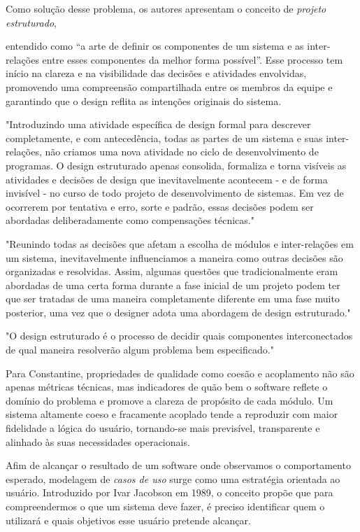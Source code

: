 \documentclass[12pt,a4paper]{article}
\begin{document}
Como solução desse problema, os autores apresentam o conceito de \textit{projeto estruturado}, %

entendido como “a arte de definir os componentes de um sistema e as inter-relações entre esses componentes da melhor forma possível”\textcite{yourdon1979structured}. Esse processo tem início na clareza e na visibilidade das decisões e atividades envolvidas, promovendo uma compreensão compartilhada entre os membros da equipe e garantindo que o design reflita as intenções originais do sistema.

"Introduzindo uma atividade específica de design formal para descrever completamente, e com antecedência, todas as partes de um sistema e suas inter-relações, não criamos uma nova atividade no ciclo de desenvolvimento de programas. O design estruturado apenas consolida, formaliza e torna visíveis as atividades e decisões de design que inevitavelmente acontecem - e de forma invisível - no curso de todo projeto de desenvolvimento de sistemas. Em vez de ocorrerem por tentativa e erro, sorte e padrão, essas decisões podem ser abordadas deliberadamente como compensações técnicas."

"Reunindo todas as decisões que afetam a escolha de módulos e inter-relações em um sistema, inevitavelmente influenciamos a maneira como outras decisões são organizadas e resolvidas. Assim, algumas questões que tradicionalmente eram abordadas de uma certa forma durante a fase inicial de um projeto podem ter que ser tratadas de uma maneira completamente diferente em uma fase muito posterior, uma vez que o designer adota uma abordagem de design estruturado."

"O design estruturado é o processo de decidir quais componentes interconectados de qual maneira resolverão algum problema bem especificado."

Para Constantine, propriedades de qualidade como coesão e acoplamento não são apenas métricas técnicas, mas indicadores de quão bem o software reflete o domínio do problema e promove a clareza de propósito de cada módulo. Um sistema altamente coeso e fracamente acoplado tende a reproduzir com maior fidelidade a lógica do usuário, tornando-se mais previsível, transparente e alinhado às suas necessidades operacionais.

Afim de alcançar o resultado de um software onde observamos o comportamento esperado, modelagem de \textit{casos de uso} surge como uma estratégia orientada ao usuário. Introduzido por Ivar Jacobson em 1989, o conceito propõe que para compreendermos o que um sistema deve fazer, é preciso identificar quem o utilizará e quais objetivos esse usuário pretende alcançar. 
\end{document}

